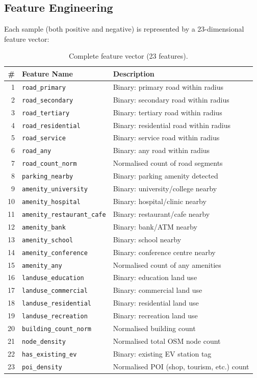 \documentclass[12pt, a4paper]{article}
\begin{document}
\subsection{Feature Engineering}
\label{sec:features}

Each sample (both positive and negative) is represented by a 
23-dimensional feature vector:

\begin{table}[H]
\centering
\caption{Complete feature vector (23 features).}
\label{tab:features}
\small
\begin{tabular}{@{}rll@{}}
\toprule
\textbf{\#} & \textbf{Feature Name} & \textbf{Description} \\
\midrule
1 & \texttt{road\_primary} & Binary: primary road within radius \\
2 & \texttt{road\_secondary} & Binary: secondary road within radius \\
3 & \texttt{road\_tertiary} & Binary: tertiary road within radius \\
4 & \texttt{road\_residential} & Binary: residential road within radius \\
5 & \texttt{road\_service} & Binary: service road within radius \\
6 & \texttt{road\_any} & Binary: any road within radius \\
7 & \texttt{road\_count\_norm} & Normalised count of road segments \\
8 & \texttt{parking\_nearby} & Binary: parking amenity detected \\
9 & \texttt{amenity\_university} & Binary: university/college nearby \\
10 & \texttt{amenity\_hospital} & Binary: hospital/clinic nearby \\
11 & \texttt{amenity\_restaurant\_cafe} & Binary: restaurant/cafe nearby \\
12 & \texttt{amenity\_bank} & Binary: bank/ATM nearby \\
13 & \texttt{amenity\_school} & Binary: school nearby \\
14 & \texttt{amenity\_conference} & Binary: conference centre nearby \\
15 & \texttt{amenity\_any} & Normalised count of any amenities \\
16 & \texttt{landuse\_education} & Binary: education land use \\
17 & \texttt{landuse\_commercial} & Binary: commercial land use \\
18 & \texttt{landuse\_residential} & Binary: residential land use \\
19 & \texttt{landuse\_recreation} & Binary: recreation land use \\
20 & \texttt{building\_count\_norm} & Normalised building count \\
21 & \texttt{node\_density} & Normalised total OSM node count \\
22 & \texttt{has\_existing\_ev} & Binary: existing EV station tag \\
23 & \texttt{poi\_density} & Normalised POI (shop, tourism, etc.) count \\
\bottomrule
\end{tabular}
\end{table}
\end{document}
